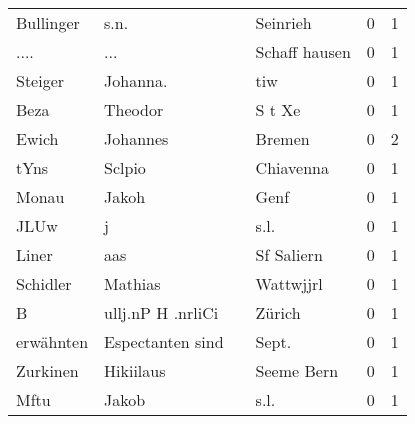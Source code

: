 \begin{tabular}{llllrr}
                Bullinger &                               s.n. &             &                                    Seinrieh &          0 &         1 \\
                     .... &                                ... &             &                               Schaff hausen &          0 &         1 \\
                  Steiger &                           Johanna. &             &                                         tiw &          0 &         1 \\
                     Beza &                            Theodor &             &                                      S t Xe &          0 &         1 \\
                    Ewich &                           Johannes &             &                                      Bremen &          0 &         2 \\
                     tYns &                             Sclpio &             &                                   Chiavenna &          0 &         1 \\
                    Monau &                              Jakoh &             &                                        Genf &          0 &         1 \\
                     JLUw &                                  j &             &                                        s.l. &          0 &         1 \\
                    Liner &                                aas &             &                                  Sf Saliern &          0 &         1 \\
                 Schidler &                            Mathias &             &                                   Wattwjjrl &          0 &         1 \\
                        B &                  ullj.nP H .nrliCi &             &                                      Zürich &          0 &         1 \\
                erwähnten &                   Espectanten sind &             &                                      Sept.  &          0 &         1 \\
                 Zurkinen &                          Hikiilaus &             &                                  Seeme Bern &          0 &         1 \\
                     Mftu &                              Jakob &             &                                        s.l. &          0 &         1 \\

\end{tabular}
